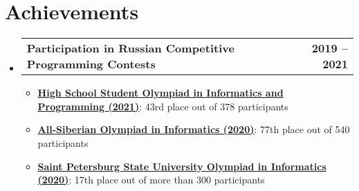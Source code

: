 \documentclass[a4,12pt]{article}
\makeatletter
\newcommand{\resumeItem}[1]{
  \item\small{
    {#1 \vspace{-2pt}}
  }
}
\newcommand{\resumeSubheadingWithoutBottomLine}[2] {
    \vspace{-2pt}\item
    \begin{tabular*}{1.0\textwidth}[t]{l@{\extracolsep{\fill}}r}
      \textbf{#1} & \textbf{\small #2} \\
    \end{tabular*}\vspace{-7pt}
}
\newcommand{\resumeSubHeadingListStart}{\begin{itemize}[leftmargin=0.0in, label={}]}
\newcommand{\resumeSubHeadingListEnd}{\end{itemize}}
\newcommand{\resumeItemListStart}{\begin{itemize}}
\newcommand{\resumeItemListEnd}{\end{itemize}\vspace{-5pt}}
\makeatother
\begin{document}
\section{Achievements}
    \resumeSubHeadingListStart
        \resumeSubheadingWithoutBottomLine{Participation in Russian Competitive Programming Contests}{2019 -- 2021}
            \resumeItemListStart
                \resumeItem{\textbf{\href{https://neerc.ifmo.ru/school/ioip/standings-2021.html}{High School Student Olympiad in Informatics and Programming (2021)}}: 43rd place out of 378 participants }
                \resumeItem{\textbf{\href{https://sesc.nsu.ru/upload/iblock/eb6/2019_3_inf_r.pdf}{All-Siberian Olympiad in Informatics (2020)}}: 77th place out of 540 participants}
                \resumeItem{\textbf{\href{http://web.archive.org/web/20200929173737/https://olympiada.spbu.ru/wp-content/uploads/info_zakl.pdf}{Saint Petersburg State University Olympiad in Informatics (2020)}}: 17th place out of more than 300 participants}

            \resumeItemListEnd
        
    \resumeSubHeadingListEnd
\end{document}
